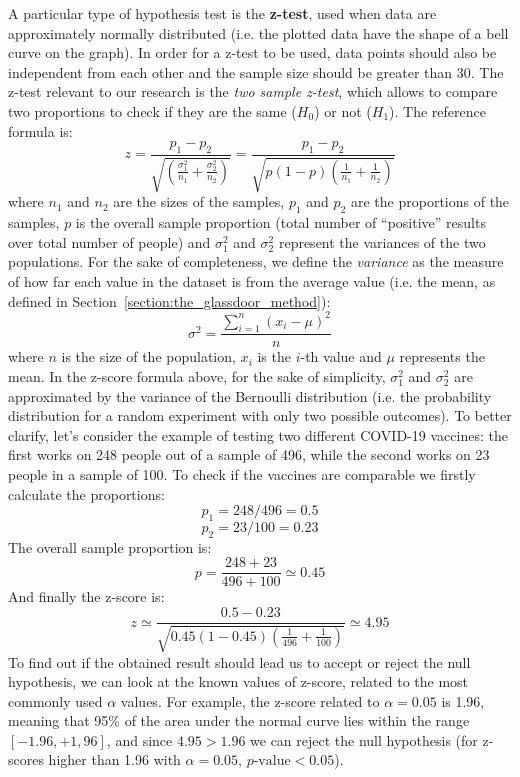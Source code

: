 A particular type of hypothesis test is the \textbf{z-test}, used when data are approximately normally distributed (i.e. the plotted data have the shape of a bell curve on the graph). In order for a z-test to be used, data points should also be independent from each other and the sample size should be greater than 30. The z-test relevant to our research is the \textit{two sample z-test}, which allows to compare two proportions to check if they are the same (\(H_0\)) or not (\(H_1\)). The reference formula is: \[z = \frac{p_1 - p_2}{\sqrt{(\frac{\sigma_1^2}{n_1} + \frac{\sigma_2^2}{n_2})}} = \frac{p_1 - p_2}{\sqrt{p(1 - p)(\frac{1}{n_1} + \frac{1}{n_2})}}\] where \(n_1\) and \(n_2\) are the sizes of the samples, \(p_1\) and \(p_2\) are the proportions of the samples, \(p\) is the overall sample proportion (total number of ``positive'' results over total number of people) and \(\sigma_1^2\) and \(\sigma_2^2\) represent the variances of the two populations. For the sake of completeness, we define the \textit{variance} as the measure of how far each value in the dataset is from the average value (i.e. the mean, as defined in Section~\ref{section:the_glassdoor_method}): \[\sigma^2 = \frac{\sum\limits_{i=1}^n (x_i - \mu)^2}{n}\] where \(n\) is the size of the population, \(x_i\) is the \(i\)-th value and \(\mu\) represents the mean. In the z-score formula above, for the sake of simplicity, \(\sigma_1^2\) and \(\sigma_2^2\) are approximated by the variance of the Bernoulli distribution (i.e. the probability distribution for a random experiment with only two possible outcomes). To better clarify, let's consider the example of testing two different COVID-19 vaccines: the first works on 248 people out of a sample of 496, while the second works on 23 people in a sample of 100. To check if the vaccines are comparable we firstly calculate the proportions: \[p_1 = 248 / 496 = 0.5\] \[p_2 = 23 / 100 = 0.23\]
The overall sample proportion is: \[p = \frac{248 + 23}{496 + 100} \simeq 0.45\]
And finally the z-score is: \[z \simeq \frac{0.5 - 0.23}{\sqrt{0.45(1 - 0.45)(\frac{1}{496} + \frac{1}{100})}} \simeq 4.95\]
To find out if the obtained result should lead us to accept or reject the null hypothesis, we can look at the known values of z-score, related to the most commonly used \(\alpha\) values. For example, the z-score related to \(\alpha = 0.05\) is 1.96, meaning that 95\% of the area under the normal curve lies within the range \([-1.96, +1,96]\), and since \(4.95 > 1.96\) we can reject the null hypothesis (for z-scores higher than 1.96 with \(\alpha = 0.05\), \(p\textrm{-value} < 0.05\)).



